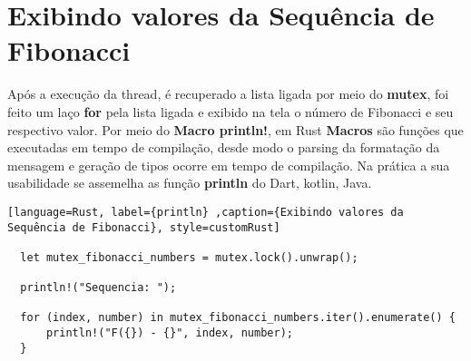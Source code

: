 \documentclass{article}
\begin{document}
\section*{Exibindo valores da Sequência de Fibonacci}
Após a execução da thread, é recuperado a lista ligada por meio do \textbf{mutex}, foi feito um laço \textbf{for} pela lista
ligada e exibido na tela o número de Fibonacci e seu respectivo valor. Por meio do \textbf{Macro println!}, em Rust \textbf{Macros}
são funções que executadas em tempo de compilação, desde modo o parsing da formatação da mensagem e geração de tipos ocorre em tempo de compilação.
Na prática a sua usabilidade se assemelha as função \textbf{println} do Dart, kotlin, Java.  

\begin{lstlisting}[language=Rust, label={println} ,caption={Exibindo valores da Sequência de Fibonacci}, style=customRust]

  let mutex_fibonacci_numbers = mutex.lock().unwrap();

  println!("Sequencia: ");
  
  for (index, number) in mutex_fibonacci_numbers.iter().enumerate() {
      println!("F({}) - {}", index, number);
  }
\end{lstlisting}




\newpage






\end{document}
